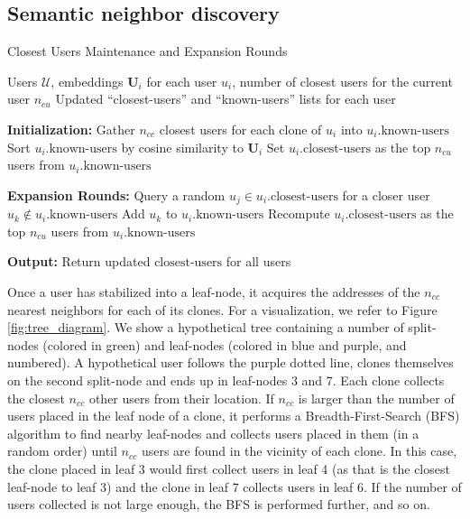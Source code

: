 \documentclass[10pt,journal]{IEEEtran}
\begin{document}
\subsection{Semantic neighbor discovery}

\begin{algorithm}[]
\caption{Closest Users Maintenance and Expansion Rounds}
\label{alg:closest_users_expansion}
\begin{algorithmic}[1]
\REQUIRE Users $\mathcal{U}$, embeddings $\mathbf{U}_i$ for each user $u_i$, number of closest users for the current user $n_{cu}$
\ENSURE Updated ``closest-users'' and ``known-users'' lists for each user

\STATE \textbf{Initialization:}
    \STATE Gather $n_{cc}$ closest users for each clone of $u_i$ into $u_i.\text{known-users}$
    \STATE Sort $u_i.\text{known-users}$ by cosine similarity to $\mathbf{U}_i$
    \STATE Set $u_i.\text{closest-users}$ as the top $n_{cu}$ users from $u_i.\text{known-users}$
\ENDFOR

\STATE \textbf{Expansion Rounds:}
        \STATE Query a random $u_j \in u_i.\text{closest-users}$ for a closer user $u_k \notin u_i.\text{known-users}$
            \STATE Add $u_k$ to $u_i.\text{known-users}$
            \STATE Recompute $u_i.\text{closest-users}$ as the top $n_{cu}$ users from $u_i.\text{known-users}$
        \ENDIF
    \ENDFOR
\ENDFOR

\STATE \textbf{Output:} Return updated $\text{closest-users}$ for all users

\end{algorithmic}
\end{algorithm}

Once a user has stabilized into a leaf-node, it acquires the addresses of the $n_{cc}$ nearest neighbors for each of its clones. For a visualization, we refer to Figure \ref{fig:tree_diagram}. We show a hypothetical tree containing a number of split-nodes (colored in green) and leaf-nodes (colored in blue and purple, and numbered). A hypothetical user follows the purple dotted line, clones themselves on the second split-node and ends up in leaf-nodes 3 and 7. Each clone collects the closest $n_{cc}$ other users from their location. If $n_{cc}$ is larger than the number of users placed in the leaf node of a clone, it performs a Breadth-First-Search (BFS) algorithm to find nearby leaf-nodes and collects users placed in them (in a random order) until $n_{cc}$ users are found in the vicinity of each clone. In this case, the clone placed in leaf 3 would first collect users in leaf 4 (as that is the closest leaf-node to leaf 3) and the clone in leaf 7 collects users in leaf 6. If the number of users collected is not large enough, the BFS is performed further, and so on.
\end{document}
